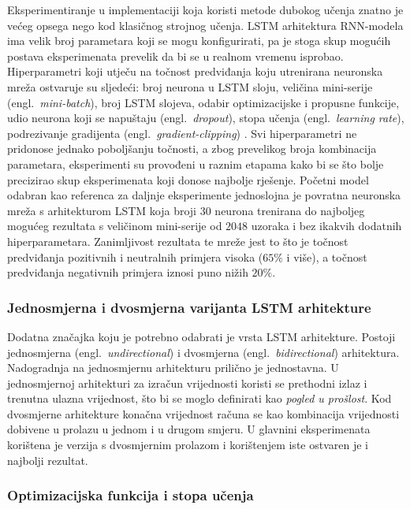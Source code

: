 \documentclass[times, utf8, zavrsni]{fer}
\begin{document}
Eksperimentiranje u implementaciji koja koristi metode dubokog učenja znatno je većeg opsega nego kod klasičnog strojnog učenja. \gls{LSTM} arhitektura \gls{RNN}-modela ima velik broj parametara koji se mogu konfigurirati, pa je stoga skup mogućih postava eksperimenata prevelik da bi se u realnom vremenu isprobao. Hiperparametri koji utječu na točnost predviđanja koju utrenirana neuronska mreža ostvaruje su sljedeći: broj neurona u \gls{LSTM} sloju, veličina mini-serije (engl.~\emph{mini-batch}), broj \gls{LSTM} slojeva, odabir optimizacijske i propusne funkcije, udio neurona koji se napuštaju (engl.~\emph{dropout}), stopa učenja (engl.~\emph{learning rate}), podrezivanje gradijenta (engl.~\emph{gradient-clipping}) \citep{parameters}. Svi hiperparametri ne pridonose jednako poboljšanju točnosti, a zbog prevelikog broja kombinacija parametara, eksperimenti su provođeni u raznim etapama kako bi se što bolje precizirao skup eksperimenata koji donose najbolje rješenje. Početni model odabran kao referenca za daljnje eksperimente jednoslojna je povratna neuronska mreža s arhitekturom \gls{LSTM} koja broji $30$ neurona trenirana do najboljeg mogućeg rezultata s veličinom mini-serije od $2048$ uzoraka i bez ikakvih dodatnih hiperparametara. Zanimljivost rezultata te mreže jest to što je točnost predviđanja pozitivnih i neutralnih primjera visoka ($65\%$ i više), a točnost predviđanja negativnih primjera iznosi puno nižih $20\%$.

\subsubsection{Jednosmjerna i dvosmjerna varijanta \gls{LSTM} arhitekture}

Dodatna značajka koju je potrebno odabrati je vrsta \gls{LSTM} arhitekture. Postoji jednosmjerna (engl.~\emph{undirectional}) i dvosmjerna (engl.~\emph{bidirectional}) arhitektura. Nadogradnja na jednosmjernu arhitekturu prilično je jednostavna. U jednosmjernoj arhitekturi za izračun vrijednosti koristi se prethodni izlaz i trenutna ulazna vrijednost, što bi se moglo definirati kao \emph{pogled u prošlost}. Kod dvosmjerne arhitekture konačna vrijednost računa se kao kombinacija vrijednosti dobivene u prolazu u jednom i u drugom smjeru. U glavnini eksperimenata korištena je verzija s dvosmjernim prolazom i korištenjem iste ostvaren je i najbolji rezultat.

\subsubsection{Optimizacijska funkcija i stopa učenja}
\end{document}
